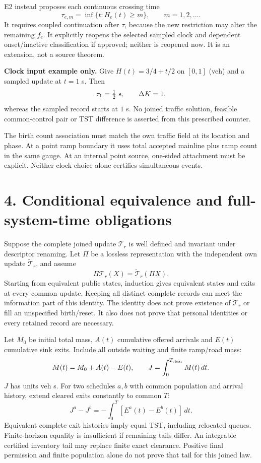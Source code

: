 \documentclass[11pt,a4paper]{article}
\begin{document}
E2 instead proposes each continuous crossing time
\begin{equation}
\tau_{e,m}=\inf\{t:H_e(t)\ge m\},\qquad m=1,2,\ldots.
\end{equation}
It requires coupled continuation after $\tau$, because the new restriction
may alter the remaining $f_e$. It explicitly reopens the selected sampled clock
and dependent onset/inactive classification if approved; neither is reopened
now. It is an extension, not a source theorem.

\textbf{Clock input example only.} Give $H(t)=3/4+t/2$ on $[0,1]$ (veh) and
a sampled update at $t=1$ s. Then
\begin{equation}
\tau_1=\tfrac12\ {\rm s},\qquad \Delta K=1,
\end{equation}
whereas the sampled record starts at $1$ s. No joined traffic solution, feasible
common-control pair or TST difference is asserted from this prescribed counter.

The birth count association must match the own traffic field at its location
and phase. At a point ramp boundary it uses total accepted mainline plus ramp
count in the same gauge. At an internal point source, one-sided attachment
must be explicit. Neither clock choice alone certifies simultaneous events.

\newpage
\section*{4. Conditional equivalence and full-system-time obligations}
Suppose the complete joined update $\mathcal T_r$ is well defined and invariant
under descriptor renaming. Let $\Pi$ be a lossless representation with the
independent own update $\widetilde{\mathcal T}_r$, and assume
\begin{equation}
\Pi\mathcal T_r(X)=\widetilde{\mathcal T}_r(\Pi X).
\end{equation}
Starting from equivalent public states, induction gives equivalent states and
exits at every common update. Keeping all distinct complete records can meet
the information part of this identity. The identity does not prove existence
of $\mathcal T_r$ or fill an unspecified birth/reset. It also does not prove
that personal identities or every retained record are necessary.

Let $M_0$ be initial total mass, $A(t)$ cumulative offered arrivals and $E(t)$
cumulative sink exits. Include all outside waiting and finite ramp/road mass:
\begin{equation}
M(t)=M_0+A(t)-E(t),\qquad J=\int_0^{T_{\rm clear}}M(t)\,dt.
\end{equation}
$J$ has units veh s. For two schedules $a,b$ with common population and arrival
history, extend cleared exits constantly to common $T$:
\begin{equation}
J^a-J^b=-\int_0^T[E^a(t)-E^b(t)]\,dt.
\end{equation}
Equivalent complete exit histories imply equal TST, including relocated queues.
Finite-horizon equality is insufficient if remaining tails differ. An integrable
certified inventory tail may replace finite exact clearance. Positive final
permission and finite population alone do not prove that tail for this joined law.
\end{document}
